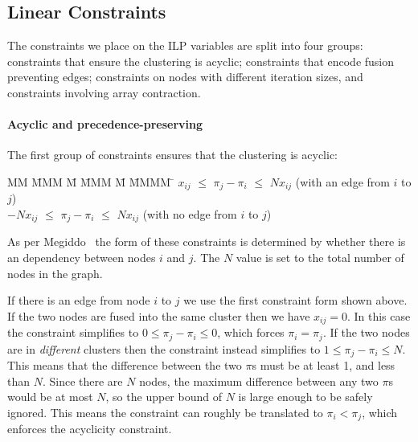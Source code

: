 \subsection{Linear Constraints}
The constraints we place on the ILP variables are split into four groups: constraints that ensure the clustering is acyclic; constraints that encode fusion preventing edges; constraints on nodes with different iteration sizes, and constraints involving array contraction. 


\paragraph{Acyclic and precedence-preserving} The first group of constraints ensures that the clustering is acyclic:
\begin{tabbing}
MM  \= MMM \= M \= MMM \= M \= MMMM \= \kill
    \>    $x_{ij}$ \> $\le$ \> $\pi_j - \pi_i$ \> $\le$ \> $N x_{ij}$ 
    \>             (with an edge from $i$ to $j$)            \\
    \> $-N x_{ij}$ \> $\le$ \> $\pi_j - \pi_i$ \> $\le$ \> $N x_{ij}$ 
    \>             (with no edge from $i$ to $j$)
\end{tabbing}
As per Megiddo~\cite{megiddo1998optimal} the form of these constraints is determined by whether there is an dependency between nodes $i$ and $j$. The $N$ value is set to the total number of nodes in the graph.

If there is an edge from node $i$ to $j$ we use the first constraint form shown above. If the two nodes are fused into the same cluster then we have $x_{ij} = 0$. In this case the constraint simplifies to $0 \le \pi_j - \pi_i \le 0$, which forces $\pi_i = \pi_j$. If the two nodes are in \emph{different} clusters then the constraint instead simplifies to $1 \le \pi_j - \pi_i \le N$. This means that the difference between the two $\pi$s must be at least 1, and less than $N$. Since there are $N$ nodes, the maximum difference between any two $\pi$s would be at most $N$, so the upper bound of $N$ is large enough to be safely ignored. This means the constraint can roughly be translated to $\pi_i < \pi_j$, which enforces the acyclicity constraint.

